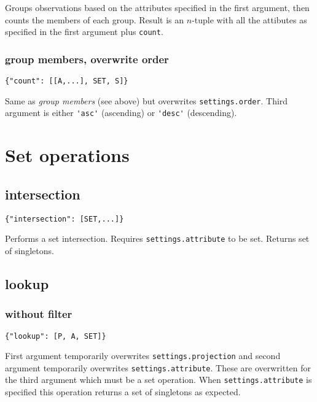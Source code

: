 \documentclass[a4paper]{article}
\begin{document}
Groups observations based on the attributes specified in the first
argument, then counts the members of each group.  Result is an
$n$-tuple with all the attibutes as specified in the first argument
plus \verb|count|.

\subsubsection{group members, overwrite order}

\begin{verbatim}
{"count": [[A,...], SET, S]}
\end{verbatim}

Same as \textit{group members} (see above) but overwrites \verb|settings.order|. Third argument is either \verb|'asc'| (ascending)
or \verb|'desc'| (descending).

\section{Set operations}

\subsection{intersection}

\begin{verbatim}
{"intersection": [SET,...]}
\end{verbatim}

Performs a set intersection. Requires \verb|settings.attribute| to be
set. Returns set of singletons.

\subsection{lookup}

\subsubsection{without filter}

\begin{verbatim}
{"lookup": [P, A, SET]}
\end{verbatim}

First argument temporarily overwrites \verb|settings.projection| and
second argument temporarily overwrites
\verb|settings.attribute|. These are overwritten for the third
argument which must be a set operation. When \verb|settings.attribute|
is specified this operation returns a set of singletons as expected.
\end{document}

